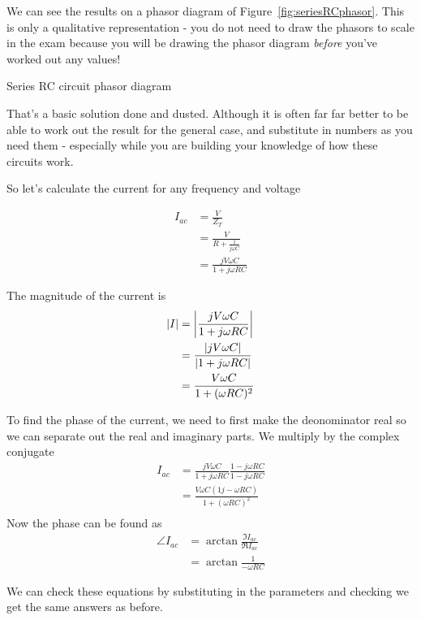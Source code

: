 \documentclass{tufte-handout}
\newcommand{\iac}{I_{ac}}%
\begin{document}
We can see the results on a phasor diagram of Figure~\ref{fig:seriesRCphasor}.  This is only a qualitative representation - you do not need to draw the phasors to scale in the exam because you will be drawing the phasor diagram \emph{before} you've worked out any values!
\begin{marginfigure}

\caption{Series RC circuit phasor diagram}
\label{fig:seriesRCphasor}
\end{marginfigure}

That's a basic solution done and dusted. Although it is often far far better to be able to work out the result for the general case, and substitute in numbers as you need them - especially while you are building your knowledge of how these circuits work.

So let's calculate the current for any frequency and voltage

\begin{align}
\iac & = \frac{V}{Z_T} \\
& = \frac{V}{R + \frac{1}{j\omega C}}\\
& = \frac{jV\omega C}{1 + j\omega RC} 
\end{align}

The magnitude of the current is
\begin{align}
\abs{I} & = \abs{\frac{jV\omega C}{1 + j\omega RC}} \\
&= \frac{\abs{jV\omega C}}{\abs{1 + j\omega RC}} \\
& = \frac{V\omega C}{1 + (\omega R C)^2} 
\end{align}

To find the phase of the current, we need to first make the deonominator real so we can separate out the real and imaginary parts. We multiply by the complex conjugate
\begin{align}
\iac &= \frac{jV\omega C}{1 + j\omega RC}\frac{1-j\omega RC}{1-j\omega RC} \\
& = \frac{V\omega C(1j - \omega RC)}{1+(\omega RC)^2}\\
\end{align}
Now the phase can be found as 
\begin{align}
\angle{\iac} &= \arctan{\frac{\Im{\iac}}{\Re{\iac}}} \\
&= \arctan{\frac{1}{-\omega RC}}
\end{align}

We can check these equations by substituting in the parameters and checking we get the same answers as before.
\end{document}
